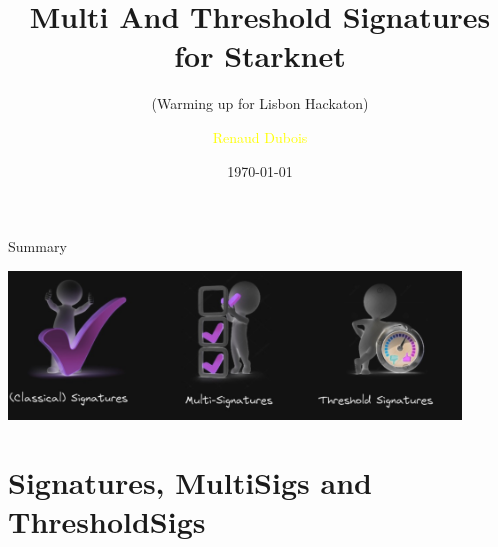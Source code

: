 \documentclass[aspectratio=43]{beamer}
\title{Multi And Threshold Signatures for Starknet} %
\subtitle{(Warming up for Lisbon Hackaton)}
\author[R. Dubois]{\textcolor{yellow}{Renaud Dubois}}
\institute[LIT]{
    \textcolor{white}{Ledger}%
    \\%
    \textcolor{white}{Innovation Team}%
} %
\date{\today}
\begin{document}
    
    \frame{\titlepage}
    \begin{frame}{Summary}
     
     {
     \begin{center}
     \includegraphics[width=12cm]{images/concepts.jpg}
     \end{center}
     }
     {
        \tableofcontents
      }  
   
    \end{frame} 
   \section{Signatures, MultiSigs and ThresholdSigs }
\end{document}
